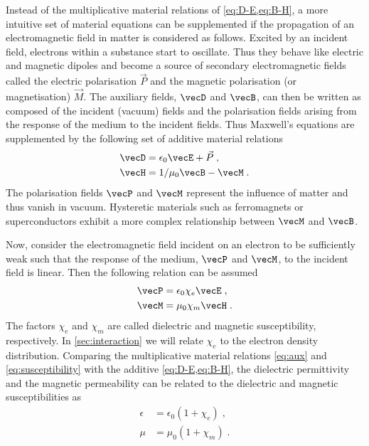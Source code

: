 \documentclass[
twoside,
openright,
titlepage,
numbers=noenddot,
headinclude,
fleqn,
a4paper,
footinclude=true,
cleardoublepage=empty,
abstractoff,
BCOR=5mm,
paper=a4,
fontsize=11pt,
british,ngerman,american,
]{scrreprt}
\begin{document}
Instead of the multiplicative material relations of
\cref{eq:D-E,eq:B-H}, a more intuitive set of material equations can
be supplemented if the propagation of an electromagnetic field in
matter is considered as follows.  Excited by an incident field,
electrons within a substance start to oscillate.  Thus they behave
like electric and magnetic dipoles and become a source of secondary
electromagnetic fields called the electric polarisation $\vec{P}$ and
the magnetic polarisation (or magnetisation) $\vec{M}$.  The auxiliary
fields, $\vecD$ and $\vecB$, can then be written as composed of the
incident (vacuum) fields and the polarisation fields arising from the
response of the medium to the incident fields.  Thus Maxwell's
equations are supplemented by the following set of additive material
relations
\begin{equation}
  \label{eq:aux}
  \begin{split}
    \vecD & = \epsilon_0\vecE+\vec{P} \;,\\
    \vecH & = 1/\mu_0\vecB-\vecM\;.\\
  \end{split}
\end{equation}
The polarisation fields $\vecP$ and $\vecM$ represent the influence of
matter and thus vanish in vacuum.  Hysteretic materials such as
ferromagnets or superconductors exhibit a more complex relationship
between $\vecM$ and $\vecB$.

Now, consider the electromagnetic field incident on an electron to be
sufficiently weak such that the response of the medium, $\vecP$ and
$\vecM$, to the incident field is linear.  Then the following relation
can be assumed
\begin{equation}
  \label{eq:susceptibility}
  \begin{split}
         \vecP&{} = \epsilon_0\chi_e\vecE \;,
      \\ \vecM&{} = \mu_0\chi_m\vecH \;.
  \end{split}
\end{equation}
The factors $\chi_e$ and $\chi_m$ are called dielectric and magnetic
susceptibility, respectively.  In \cref{sec:interaction} we will
relate $\chi_e$ to the electron density distribution.  Comparing the
multiplicative material relations \eqref{eq:aux} and
\eqref{eq:susceptibility} with the additive \cref{eq:D-E,eq:B-H}, the
dielectric permittivity and the magnetic permeability can be related
to the dielectric and magnetic susceptibilities as
\begin{equation}
  \label{eq:susceptibilities}
  \begin{split}
    \epsilon&{} = \epsilon_0(1+\chi_e)\;,
    \\ \mu&{} = \mu_0(1+\chi_m)\;.
  \end{split}
\end{equation}
\end{document}
